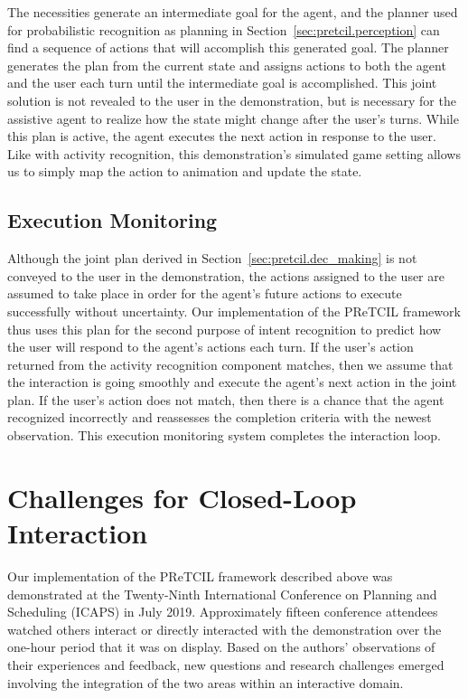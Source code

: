 \documentclass[letterpaper]{article} %
\begin{document}
The necessities generate an intermediate goal for the agent, and the planner used for probabilistic recognition as planning in Section~\ref{sec:pretcil.perception} can find a sequence of actions that will accomplish this generated goal.  The planner generates the plan from the current state and assigns actions to both the agent and the user each turn until the intermediate goal is accomplished.  This joint solution is not revealed to the user in the demonstration, but is necessary for the assistive agent to realize how the state might change after the user's turns.  While this plan is active, the agent executes the next action in response to the user.  Like with activity recognition, this demonstration's simulated game setting allows us to simply map the action to animation and update the state.

\subsection{Execution Monitoring\label{sec:pretcil.exec_monitor}}
Although the joint plan derived in Section~\ref{sec:pretcil.dec_making} is not conveyed to the user in the demonstration, the actions assigned to the user are assumed to take place in order for the agent's future actions to execute successfully without uncertainty.  Our implementation of the {\sc PReTCIL} framework thus uses this plan for the second purpose of intent recognition to predict how the user will respond to the agent's actions each turn.  If the user's action returned from the activity recognition component matches, then we assume that the interaction is going smoothly and execute the agent's next action in the joint plan.  If the user's action does not match, then there is a chance that the agent recognized incorrectly and reassesses the %
completion criteria with the newest observation.  This execution monitoring system completes the interaction loop.%

\section{Challenges for Closed-Loop Interaction \label{sec:challenges}}
Our implementation of the {\sc PReTCIL} framework described above was demonstrated at the Twenty-Ninth International Conference on Planning and Scheduling (ICAPS) in July 2019.  Approximately fifteen conference attendees watched others interact or directly interacted with the demonstration over the one-hour period that it was on display.  Based on the authors' observations of their experiences and feedback, new questions and research challenges emerged involving the integration of the two areas within an interactive domain.
\end{document}
